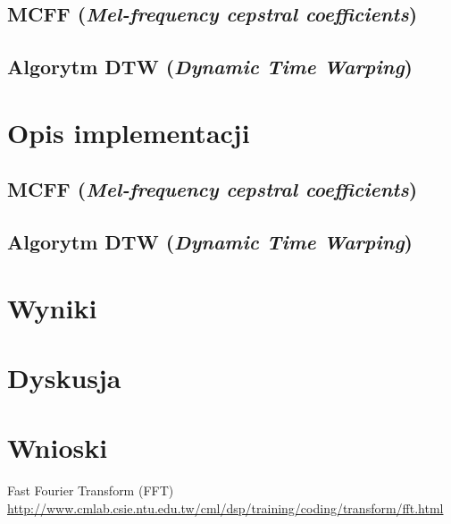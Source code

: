 \documentclass{classrep}
\begin{document}
\subsection{MCFF (\textit{Mel-frequency cepstral coefficients})}

\subsection{Algorytm DTW (\textit{Dynamic Time Warping})}

\section{Opis implementacji}
\subsection{MCFF (\textit{Mel-frequency cepstral coefficients})}

\subsection{Algorytm DTW (\textit{Dynamic Time Warping})}

\section{Wyniki}

\section{Dyskusja}

\section{Wnioski}

\begin{thebibliography}{1}
 Fast Fourier Transform (FFT) \url{http://www.cmlab.csie.ntu.edu.tw/cml/dsp/training/coding/transform/fft.html}
\end{thebibliography}
\end{document}
